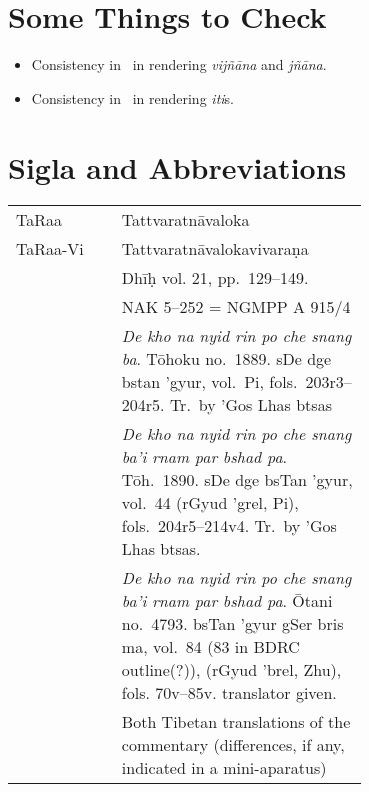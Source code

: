 \documentclass[12pt]{book}
\begin{document}
\section*{Some Things to Check}
\begin{itemize}
	\item Consistency in \TIB\ in rendering \emph{vijñāna} and \emph{jñāna}. 

	\item Consistency in \TIB\ in rendering \emph{iti}s. 
\end{itemize}
\newpage
\section*{Sigla and Abbreviations}
\noindent\begin{longtable}{ l p{0.7\linewidth} }
	\noindent TaRaa & Tattvaratnāvaloka\\

	\noindent TaRaa-Vi & Tattvaratnāvalokavivaraṇa\\

	\noindent \EDD\ & Dhīḥ vol. 21, pp.\ 129–149.\\

	\noindent \MS\ & NAK 5–252 = NGMPP A 915/4\\

	\noindent \TM & \emph{De kho na nyid rin po che snang ba}. Tōhoku no.\ 1889. sDe dge bstan 'gyur, vol.\ Pi, fols.\ 203r3–204r5. Tr.\ by 'Gos Lhas btsas\\

	\noindent \TVA & \emph{De kho na nyid rin po che snang ba'i rnam par bshad pa}.  Tōh.\ 1890. sDe dge bsTan 'gyur, vol.\ 44 (rGyud 'grel, Pi), fols.\ 204r5–214v4. Tr.\ by 'Gos Lhas btsas.\\

	\noindent \TVB & \emph{De kho na nyid rin po che snang ba'i rnam par bshad pa}. Ōtani no.\ 4793. bsTan 'gyur gSer bris ma, vol.\ 84 (83 in BDRC outline(?)), (rGyud 'brel, Zhu), fols. 70v–85v. translator given.\\

	\noindent \TIB & Both Tibetan translations of the commentary (differences, if any, indicated in a mini-aparatus)
\end{longtable}
\end{document}
